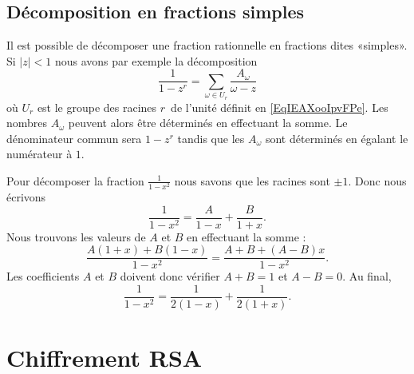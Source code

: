 \subsection{Décomposition en fractions simples}
\label{SUBSECooSIYXooDDHUdD}


Il est possible de décomposer une fraction rationnelle en fractions dites «simples». Si \( | z |<1\) nous avons par exemple la décomposition
\begin{equation}        \label{EqDWYBooJIMBAt}
    \frac{1}{ 1-z^r }=\sum_{\omega\in U_r}\frac{ A_{\omega} }{ \omega-z }
\end{equation}
où \( U_r\) est le groupe des racines \( r\)\ieme\ de l'unité définit en \eqref{EqIEAXooIpvFPe}. Les nombres \( A_{\omega}\) peuvent alors être déterminés en effectuant la somme. Le dénominateur commun sera \( 1-z^r\) tandis que les \( A_{\omega}\) sont déterminés en égalant le numérateur à \( 1\).

\begin{example}
    Pour décomposer la fraction \( \frac{1}{ 1-x^2 }\) nous savons que les racines sont \( \pm 1\). Donc nous écrivons
    \begin{equation}
        \frac{1}{ 1-x^2 }=\frac{ A }{ 1-x }+\frac{ B }{ 1+x }.
    \end{equation}
    Nous trouvons les valeurs de \( A\) et \( B\) en effectuant la somme :
    \begin{equation}
        \frac{ A(1+x)+B(1-x) }{ 1-x^2 }=\frac{ A+B+(A-B)x }{ 1-x^2 }.
    \end{equation}
    Les coefficients \( A\) et \( B\) doivent donc vérifier \( A+B=1\) et \( A-B=0\). Au final,
    \begin{equation}
        \frac{1}{ 1-x^2 }=\frac{1}{ 2(1-x) }+\frac{1}{ 2(1+x) }.
    \end{equation}
\end{example}

\section{Chiffrement RSA}
\label{SecEVaFYi}

